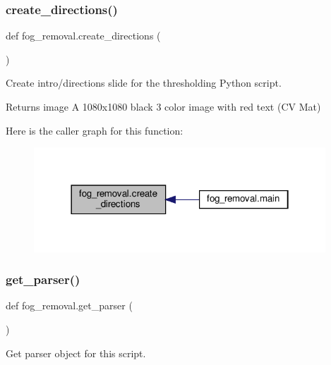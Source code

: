 \subsubsection{\texorpdfstring{create\+\_\+directions()}{create\_directions()}}
{\footnotesize\ttfamily def fog\+\_\+removal.\+create\+\_\+directions (\begin{DoxyParamCaption}{ }\end{DoxyParamCaption})}



Create intro/directions slide for the thresholding Python script. 

\begin{DoxyReturn}{Returns}
image A 1080x1080 black 3 color image with red text (CV Mat) 
\end{DoxyReturn}
Here is the caller graph for this function\+:\nopagebreak
\begin{figure}[H]
\begin{center}
\leavevmode
\includegraphics[width=310pt]{namespacefog__removal_acc10907c635ab765dcf02a6fc6499620_icgraph}
\end{center}
\end{figure}
\mbox{\label{namespacefog__removal_a89c98f8f9a6d048485938fc05675ce9e}} 
\subsubsection{\texorpdfstring{get\+\_\+parser()}{get\_parser()}}
{\footnotesize\ttfamily def fog\+\_\+removal.\+get\+\_\+parser (\begin{DoxyParamCaption}{ }\end{DoxyParamCaption})}



Get parser object for this script. 

